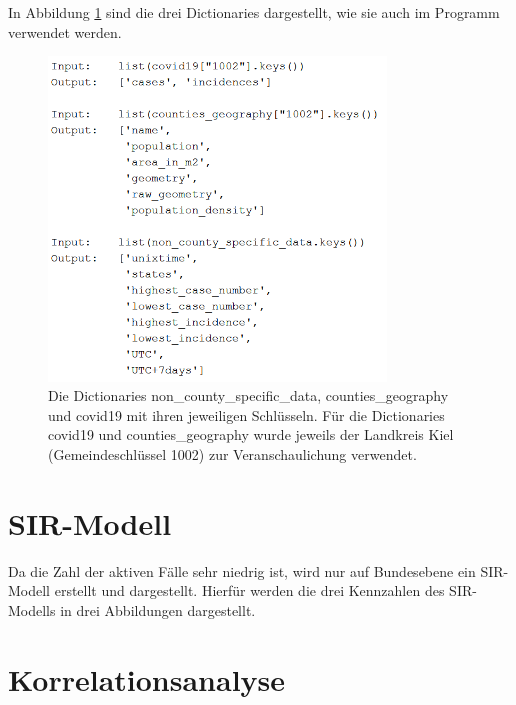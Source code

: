In Abbildung \ref{fig:dicts_als_code} sind die drei Dictionaries dargestellt, wie sie auch im Programm verwendet werden.
\begin{figure}[H]
    \centering
    \includegraphics[width=0.8\textwidth]{figures/Durchführung/Dictionarys Bachelorprojekt.png}
    \caption{
    Die Dictionaries non\_county\_specific\_data, counties\_geography und covid19 mit ihren jeweiligen Schlüsseln.
    Für die Dictionaries covid19 und counties\_geography wurde jeweils der Landkreis Kiel (Gemeindeschlüssel 1002) zur Veranschaulichung verwendet.}
    \label{fig:dicts_als_code}
\end{figure}


\section{SIR-Modell}
Da die Zahl der aktiven Fälle sehr niedrig ist, wird nur auf Bundesebene ein SIR-Modell erstellt und dargestellt. 
Hierfür werden die drei Kennzahlen des SIR-Modells in drei Abbildungen dargestellt.

\section{Korrelationsanalyse}

